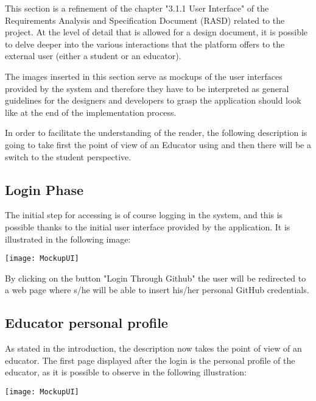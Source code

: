 This section is a refinement of the chapter "3.1.1 User Interface" of the Requirements Analysis and Specification Document (RASD) related to the \app project.
At the level of detail that is allowed for a design document, it is possible to delve deeper into the various interactions that the platform offers to the external user (either a student or an educator). 

The images inserted in this section serve as mockups of the user interfaces provided by the system and therefore they have to be interpreted as general guidelines for the designers and developers to grasp the application should look like at the end of the implementation process. 

In order to facilitate the understanding of the reader, the following description is going to take first the point of view of an Educator using \app and then there will be a switch to the student perspective.

\subsection{Login Phase}
The initial step for accessing \app is of course logging in the system, and this is possible thanks to the initial user interface provided by the application. It is illustrated in the following image:

\begin{center}
\texttt{[image: MockupUI]}
\end{center}

By clicking on the button "Login Through Github" the user will be redirected to a web page where s/he will be able to insert his/her personal GitHub credentials.

\begin{minipage}{\linewidth}
\subsection{Educator personal profile}
As stated in the introduction, the description now takes the point of view of an educator.
The first page displayed after the login is the personal profile of the educator, as it is possible to observe in the following illustration:

\begin{center}
	\texttt{[image: MockupUI]}
\end{center}

\end{minipage}

